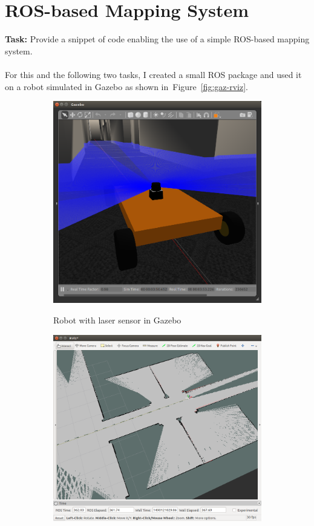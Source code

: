 \documentclass[a4paper,11pt]{article}
\newcommand{\reffig}[1]{Figure~\ref{#1}}
\begin{document}
\section{ROS-based Mapping System}
\label{sec:e4}
\textbf{Task:} Provide a snippet of code enabling the use of a simple
ROS-based mapping system.\\
\vspace{0.2cm}\\
For this and the following two tasks, I created a small ROS package
and used it on a robot simulated in Gazebo as shown
in~\reffig{fig:gaz-rviz}.
\begin{figure}
  \centering
  \begin{subfigure}[b]{0.45\textwidth}
    \includegraphics[width=\textwidth]{qbot-gazebo}
    \label{fig:gaz}
    \caption{Robot with laser sensor in Gazebo}
  \end{subfigure}
  \begin{subfigure}[b]{0.48\textwidth}
    \includegraphics[width=\textwidth]{qbot-rviz}

\end{subfigure}
\end{figure}
\end{document}
